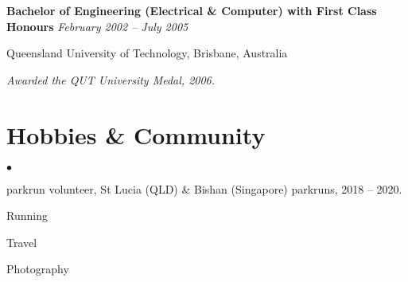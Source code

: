\documentclass[margin,line]{resume}
\newenvironment{list1}{
  \begin{list}{}{%
      \setlength{\itemsep}{0in}
      \setlength{\parsep}{0in} \setlength{\parskip}{0in}
      \setlength{\topsep}{0in} \setlength{\partopsep}{0in}
      \setlength{\leftmargin}{0.17in}}}{\end{list}}
\newenvironment{list2}{
  \begin{list}{$\bullet$}{%
      \setlength{\itemsep}{0in}
      \setlength{\parsep}{0in} \setlength{\parskip}{0in}
      \setlength{\topsep}{0in} \setlength{\partopsep}{0in}
      \setlength{\leftmargin}{0.2in}}}{\end{list}}
\begin{document}
\begin{resume}
{\bf Bachelor of Engineering (Electrical \& Computer) with First Class Honours} \hfill {\it February 2002 -- July 2005} \\\vspace{-0.85\baselineskip}
\begin{list1}
\item[] Queensland University of Technology, Brisbane, Australia
\item {\it Awarded the QUT University Medal, 2006.}
\end{list1}

\section{\sc Hobbies \& Community}
\begin{list2}
\item parkrun volunteer, St Lucia (QLD) \& Bishan (Singapore) parkruns, 2018 -- 2020.
\item Running
\item Travel
\item Photography
\end{list2}


\end{resume}
\end{document}
